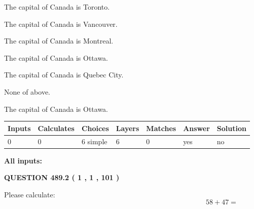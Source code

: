 \documentclass[12pt]{article}
\begin{document}
 
The capital of Canada is Toronto.
 
 
The capital of Canada is Vancouver.
 
 
The capital of Canada is Montreal.
 
 
The capital of Canada is Ottawa.
 
 
The capital of Canada is Quebec City.
 
 
 None of above.
 
 
\noindent{}
 
 
The capital of Canada is Ottawa.
 
 
\noindent{}
 
 
   
   
   
   
\noindent\begin{tabular}{|l|l|l|l|l|l|l|}
 \hline
Inputs & Calculates & Choices & Layers & Matches & Answer & Solution \\ \hline
 0  & 
 0  & 
 6
  simple  
  & 
 6  & 
 0  & 
  yes & 
  no 
  \\ \hline
 \end{tabular}
   
   
   
   
\noindent{}
   
   
   
   
\noindent\vspace{0.1in}\hspace{-0.08in} {\textbf{\Large{All inputs: }}}
   
   
  
\vspace{0.2in}
  
{\textbf{\Large{QUESTION
489.2 
 ( 1 , 1 , 101 )
}}}
  
  
 
Please calculate:
\begin{equation}
58 +  %
47 = \nonumber
\end{equation}
 
 
 
\noindent{}
 
\end{document}
